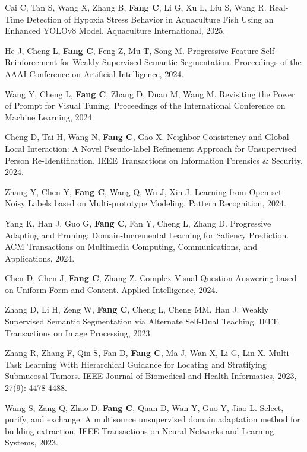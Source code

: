 \documentclass[a4paper,36pt]{article}
\newcommand{\tb}[1]{\textbf{#1}}
\newcommand{\resumeItemWithoutTitle}[1]{
  \item\justifying\small{
    {#1 \vspace{-2pt}}
  }
}
\begin{document}
\resumeItemWithoutTitle{Cai C, Tan S, Wang X, Zhang B, \tb{Fang C}, Li G, Xu L, Liu S, Wang R. Real-Time Detection of Hypoxia Stress Behavior in Aquaculture Fish Using an Enhanced YOLOv8 Model. Aquaculture International, 2025.}

\resumeItemWithoutTitle{He J, Cheng L, \tb{Fang C}, Feng Z, Mu T, Song M. Progressive Feature Self-Reinforcement for Weakly Supervised Semantic Segmentation. Proceedings of the AAAI Conference on Artificial Intelligence, 2024. }

\resumeItemWithoutTitle{Wang Y, Cheng L, \tb{Fang C}, Zhang D, Duan M, Wang M. Revisiting the Power of Prompt for Visual Tuning. Proceedings of the International Conference on Machine Learning, 2024. }

\resumeItemWithoutTitle{Cheng D, Tai H, Wang N, \tb{Fang C}, Gao X. Neighbor Consistency and Global-Local Interaction: A Novel Pseudo-label Refinement Approach for Unsupervised Person Re-Identification. IEEE Transactions on Information Forensics \& Security, 2024.}

\resumeItemWithoutTitle{Zhang Y, Chen Y, \tb{Fang C}, Wang Q, Wu J, Xin J. Learning from Open-set Noisy Labels based on Multi-prototype Modeling. Pattern Recognition, 2024.}

\resumeItemWithoutTitle{Yang K, Han J, Guo G, \tb{Fang C}, Fan Y, Cheng L, Zhang D. Progressive Adapting and Pruning: Domain-Incremental Learning for Saliency Prediction. ACM Transactions on Multimedia Computing, Communications, and Applications, 2024.}

\resumeItemWithoutTitle{Chen D, Chen J, \tb{Fang C}, Zhang Z. Complex Visual Question Answering based on Uniform Form and Content. Applied Intelligence, 2024.}

\resumeItemWithoutTitle{Zhang D, Li H, Zeng W, \tb{Fang C}, Cheng L, Cheng MM, Han J. Weakly Supervised Semantic Segmentation via Alternate Self-Dual Teaching. IEEE Transactions on Image Processing, 2023.}

\resumeItemWithoutTitle{Zhang R, Zhang F, Qin S, Fan D, \tb{Fang C}, Ma J, Wan X, Li G, Lin X. Multi-Task Learning With Hierarchical Guidance for Locating and Stratifying Submucosal Tumors. IEEE Journal of Biomedical and Health Informatics, 2023, 27(9): 4478-4488.}

\resumeItemWithoutTitle{Wang S, Zang Q, Zhao D, \tb{Fang C}, Quan D, Wan Y, Guo Y, Jiao L. Select, purify, and exchange: A multisource unsupervised domain adaptation method for building extraction. IEEE Transactions on Neural Networks and Learning Systems, 2023.}
\end{document}
